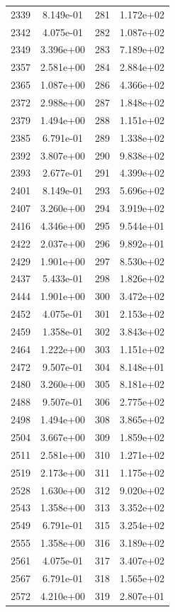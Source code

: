 \documentclass[12pt]{article}
\begin{document}
\begin{longtable}{@{}cccc@{}}
2339 & 8.149e-01 & 281 & 1.172e+02 \\
2342 & 4.075e-01 & 282 & 1.087e+02 \\
2349 & 3.396e+00 & 283 & 7.189e+02 \\
2357 & 2.581e+00 & 284 & 2.884e+02 \\
2365 & 1.087e+00 & 286 & 4.366e+02 \\
2372 & 2.988e+00 & 287 & 1.848e+02 \\
2379 & 1.494e+00 & 288 & 1.151e+02 \\
2385 & 6.791e-01 & 289 & 1.338e+02 \\
2392 & 3.807e+00 & 290 & 9.838e+02 \\
2393 & 2.677e-01 & 291 & 4.399e+02 \\
2401 & 8.149e-01 & 293 & 5.696e+02 \\
2407 & 3.260e+00 & 294 & 3.919e+02 \\
2416 & 4.346e+00 & 295 & 9.544e+01 \\
2422 & 2.037e+00 & 296 & 9.892e+01 \\
2429 & 1.901e+00 & 297 & 8.530e+02 \\
2437 & 5.433e-01 & 298 & 1.826e+02 \\
2444 & 1.901e+00 & 300 & 3.472e+02 \\
2452 & 4.075e-01 & 301 & 2.153e+02 \\
2459 & 1.358e-01 & 302 & 3.843e+02 \\
2464 & 1.222e+00 & 303 & 1.151e+02 \\
2472 & 9.507e-01 & 304 & 8.148e+01 \\
2480 & 3.260e+00 & 305 & 8.181e+02 \\
2488 & 9.507e-01 & 306 & 2.775e+02 \\
2498 & 1.494e+00 & 308 & 3.865e+02 \\
2504 & 3.667e+00 & 309 & 1.859e+02 \\
2511 & 2.581e+00 & 310 & 1.271e+02 \\
2519 & 2.173e+00 & 311 & 1.175e+02 \\
2528 & 1.630e+00 & 312 & 9.020e+02 \\
2543 & 1.358e+00 & 313 & 3.352e+02 \\
2549 & 6.791e-01 & 315 & 3.254e+02 \\
2555 & 1.358e+00 & 316 & 3.189e+02 \\
2561 & 4.075e-01 & 317 & 3.407e+02 \\
2567 & 6.791e-01 & 318 & 1.565e+02 \\
2572 & 4.210e+00 & 319 & 2.807e+01 \\

\end{longtable}
\end{document}

